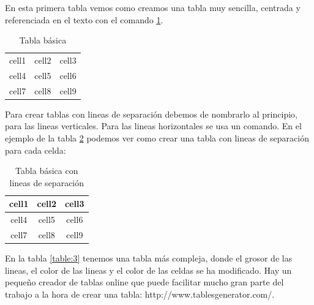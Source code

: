 
En esta primera tabla vemos como creamos una tabla muy sencilla, centrada y referenciada en el texto con el comando \ref{table:1}.

\begin{table}[H]
    \centering
    
    \begin{tabular}{ c c c }
     cell1 & cell2 & cell3 \\ 
     cell4 & cell5 & cell6 \\  
     cell7 & cell8 & cell9    
    \end{tabular}
    
    \caption{Tabla básica}
    \label{table:1}
    
\end{table}

Para crear tablas con lineas de separación debemos de nombrarlo al principio, para las lineas verticales. Para las lineas horizontales se usa un comando. En el ejemplo de la tabla \ref{table:2} podemos ver como crear una tabla con lineas de separación para cada celda:

\begin{table}[H]
    \centering
    
    \begin{tabular}{ ||c | c | c|| }
    \hline
     cell1 & cell2 & cell3 \\ 
     \hline
     \hline
     cell4 & cell5 & cell6 \\  
     \hline
     cell7 & cell8 & cell9 \\
     \hline
    \end{tabular}
    
    \caption{Tabla básica con lineas de separación}
    \label{table:2}
    
\end{table}

En la tabla \ref{table:3} tenemos una tabla más compleja, donde el grosor de las lineas, el color de las lineas y el color de las celdas se ha modificado. Hay un pequeño creador de tablas online que puede facilitar mucho gran parte del trabajo a la hora de crear una tabla: http://www.tablesgenerator.com/.

